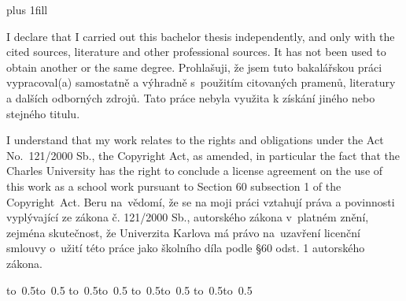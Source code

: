 \newpage

\openright
\hypersetup{pageanchor=true}
\pagestyle{plain}
\vglue 0pt plus 1fill

\ifEN
\noindent
I declare that I carried out this bachelor thesis independently, and only with the cited
sources, literature and other professional sources. It has not been used to obtain another
or the same degree.
\else
\noindent
Prohlašuji, že jsem tuto bakalářskou práci vypracoval(a) samostatně a výhradně
s~použitím citovaných pramenů, literatury a dalších odborných zdrojů.
Tato práce nebyla využita k získání jiného nebo stejného titulu.
\fi

\ifEN
\medskip\noindent
I understand that my work relates to the rights and obligations under the Act No.~121/2000 Sb.,
the Copyright Act, as amended, in particular the fact that the Charles
University has the right to conclude a license agreement on the use of this
work as a school work pursuant to Section 60 subsection 1 of the Copyright~Act.
\else
\medskip\noindent
Beru na~vědomí, že se na moji práci vztahují práva a povinnosti vyplývající
ze zákona č. 121/2000 Sb., autorského zákona v~platném znění, zejména skutečnost,
že Univerzita Karlova má právo na~uzavření licenční smlouvy o~užití této
práce jako školního díla podle §60 odst. 1 autorského zákona.
\fi

\vspace{10mm}


\ifEN
\hbox{\hbox to 0.5\hbox to 0.5\hsize{\dotfill\quad}}
\smallskip
\hbox{\hbox to 0.5\hsize{}\hbox to 0.5}
\else
\hbox{\hbox to 0.5\hbox to 0.5\hsize{\dotfill\quad}}
\smallskip
\hbox{\hbox to 0.5\hsize{}\hbox to 0.5}
\fi

\vspace{20mm}
\newpage


\openright

\noindent
\Dedication

\newpage


\openright

